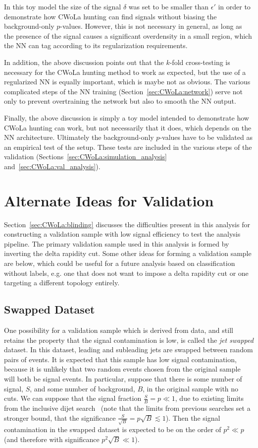 In this toy model the size of the signal $\delta$ was set to be smaller than $\epsilon'$ in order to demonstrate how CWoLa hunting can find signals without biasing the background-only $p$-values.
However, this is not necessary in general, as long as the presence of the signal causes a significant overdensity in a small region, which the NN can tag according to its regularization requirements. 

In addition, the above discussion points out that the $k$-fold cross-testing is necessary for the CWoLa hunting method to work as expected, but the use of a regularized NN is equally important, which is maybe not as obvious.
The various complicated steps of the NN training (Section~\ref{sec:CWoLa:network}) serve not only to prevent overtraining the network but also to smooth the NN output.

Finally, the above discussion is simply a toy model intended to demonstrate how CWoLa hunting can work, but not necessarily that it does, which depends on the NN architecture.
Ultimately the background-only $p$-values have to be validated as an empirical test of the setup.
These tests are included in the various steps of the validation (Sections~\ref{sec:CWoLa:simulation_analysis} and~\ref{sec:CWoLa:val_analysis}).

\section{Alternate Ideas for Validation}
\label{app:CWoLa:validation_alternate}
Section~\ref{sec:CWoLa:blinding} discusses the difficulties present in this analysis for constructing a validation sample with low signal efficiency to test the analysis pipeline.
The primary validation sample used in this analysis is formed by inverting the delta rapidity cut.
Some other ideas for forming a validation sample are below, which could be useful for a future analysis based on classification without labels, e.g. one that does not want to impose a delta rapidity cut or one targeting a different topology entirely.

\subsection{Swapped Dataset}
One possibility for a validation sample which is derived from data, and still retains the property that the signal contamination is low, is called the \textit{jet swapped} dataset.
In this dataset, leading and subleading jets are swapped between random pairs of events.
It is expected that this sample has low signal contamination, because it is unlikely that two random events chosen from the original sample will both be signal events.
In particular, suppose that there is some number of signal, $S$, and some number of background, $B$, in the original sample with no cuts.
We can suppose that the signal fraction $\frac{S}{B} = p\ll1$, due to existing limits from the inclusive dijet search~\cite{Aad:2019hjw} (note that the limits from previous searches set a stronger bound, that the significance $\frac{S}{\sqrt{B}}=p\sqrt{B} \lesssim 1$).
Then the signal contamination in the swapped dataset is expected to be on the order of $p^2 \ll p$ (and therefore with significance $p^2\sqrt{B} \ll 1$).

